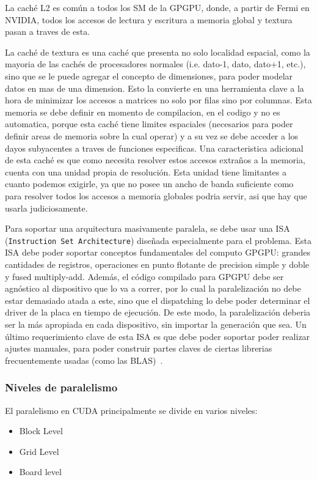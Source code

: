 La cach\'e L2 es com\'un a todos los SM de la GPGPU, donde, a partir de Fermi en NVIDIA, todos
los accesos de lectura y escritura a memoria global y textura pasan a traves de esta. ~\cite{NvidiaFermi}

La cach\'e de textura es una cach\'e que presenta no solo localidad espacial, como la mayoria
de las cach\'es de procesadores normales (i.e. dato-1, dato, dato+1, etc.), sino que se le
puede agregar el concepto de dimensiones, para poder modelar datos en mas de una dimension.
Esto la convierte en una herramienta clave a la hora de minimizar los accesos a matrices
no solo por filas sino por columnas. Esta memoria se debe definir en momento de compilacion,
en el codigo y no es automatica, porque esta cach\'e tiene limites espaciales (necesarios
para poder definir areas de memoria sobre la cual operar) y a su vez se debe acceder
a los dayos subyacentes a traves de funciones especificas. Una caracteristica adicional
de esta cach\'e es que como necesita resolver estos accesos extra\~nos a la memoria, cuenta
con una unidad propia de resoluci\'on. Esta unidad tiene limitantes a cuanto podemos
exigirle, ya que no posee un ancho de banda suficiente como para resolver todos los
accesos a memoria globales podria servir, asi que hay que usarla judiciosamente.

Para soportar una arquitectura masivamente paralela, se debe usar una ISA
(\texttt{Instruction Set Architecture}) dise\~nada especialmente para el problema. Esta ISA
debe poder soportar conceptos fundamentales del computo GPGPU: grandes cantidades de registros,
operaciones en punto flotante de precision simple y doble y fused multiply-add. Adem\'as,
el c\'odigo compilado para GPGPU debe ser agn\'ostico al dispositivo que lo va a correr, por
lo cual la paralelizaci\'on no debe estar demasiado atada a este, sino que el dispatching
lo debe poder determinar el driver de la placa en tiempo de ejecuci\'on. De este modo, la paralelizaci\'on
deberia ser la m\'as apropiada en cada dispositivo, sin importar la generaci\'on que sea. Un \'ultimo
requerimiento clave de esta ISA es que debe poder soportar poder realizar ajustes manuales,
para poder construir partes claves de ciertas librerias frecuentemente usadas (como las BLAS)~\cite{NvidiaFermi}.


\subsubsection{Niveles de paralelismo}
El paralelismo en CUDA principalmente se divide en varios niveles:
\begin{itemize}
  \item Block Level
  \item Grid Level
  \item Board level
\end{itemize}


